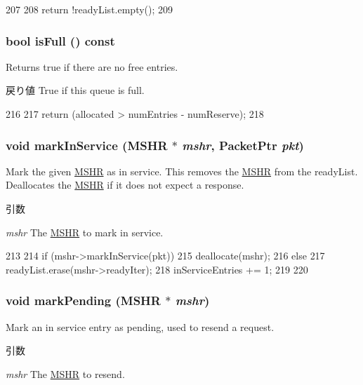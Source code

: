 \begin{DoxyCode}
207     {
208         return !readyList.empty();
209     }
\end{DoxyCode}
\hypertarget{classMSHRQueue_a7ffe8a6212a0eb3fc7bbc8e9bc51dfcd}{
\subsubsection[{isFull}]{\setlength{\rightskip}{0pt plus 5cm}bool isFull () const}}
\label{classMSHRQueue_a7ffe8a6212a0eb3fc7bbc8e9bc51dfcd}
Returns true if there are no free entries. \begin{DoxyReturn}{戻り値}
True if this queue is full. 
\end{DoxyReturn}



\begin{DoxyCode}
216     {
217         return (allocated > numEntries - numReserve);
218     }
\end{DoxyCode}
\hypertarget{classMSHRQueue_a1131b37f2a7bef3428b45951455cfcad}{
\subsubsection[{markInService}]{\setlength{\rightskip}{0pt plus 5cm}void markInService ({\bf MSHR} $\ast$ {\em mshr}, \/  {\bf PacketPtr} {\em pkt})}}
\label{classMSHRQueue_a1131b37f2a7bef3428b45951455cfcad}
Mark the given \hyperlink{classMSHR}{MSHR} as in service. This removes the \hyperlink{classMSHR}{MSHR} from the readyList. Deallocates the \hyperlink{classMSHR}{MSHR} if it does not expect a response. 
\begin{DoxyParams}{引数}
\item[{\em mshr}]The \hyperlink{classMSHR}{MSHR} to mark in service. \end{DoxyParams}



\begin{DoxyCode}
213 {
214     if (mshr->markInService(pkt)) {
215         deallocate(mshr);
216     } else {
217         readyList.erase(mshr->readyIter);
218         inServiceEntries += 1;
219     }
220 }
\end{DoxyCode}
\hypertarget{classMSHRQueue_ab0f258b25fe50dc16d5e3e5890214c5c}{
\subsubsection[{markPending}]{\setlength{\rightskip}{0pt plus 5cm}void markPending ({\bf MSHR} $\ast$ {\em mshr})}}
\label{classMSHRQueue_ab0f258b25fe50dc16d5e3e5890214c5c}
Mark an in service entry as pending, used to resend a request. 
\begin{DoxyParams}{引数}
\item[{\em mshr}]The \hyperlink{classMSHR}{MSHR} to resend. \end{DoxyParams}


